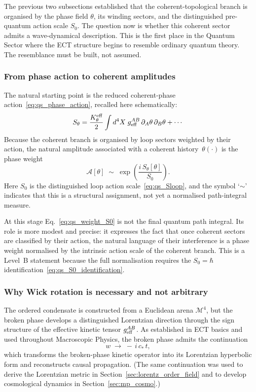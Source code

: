 \medskip
The previous two subsections established that the coherent-topological
branch is organised by the phase field $\theta$, its winding sectors,
and the distinguished pre-quantum action scale $S_0$.
The question now is whether this coherent sector admits a
wave-dynamical description.
This is the first place in the Quantum Sector where the ECT structure
begins to resemble ordinary quantum theory.
The resemblance must be built, not assumed.

\subsubsection*{From phase action to coherent amplitudes}

The natural starting point is the reduced coherent-phase
action~\eqref{eq:qs_phase_action}, recalled here schematically:
\[
  S_\theta
  = \frac{K_\theta^{\rm eff}}{2}
    \int d^4X\; g_{\rm eff}^{AB}\,\partial_A\theta\,\partial_B\theta
    + \cdots
\]
Because the coherent branch is organised by loop sectors weighted by
their action, the natural amplitude associated with a coherent
history~$\theta(\cdot)$ is the phase weight
\begin{equation}
  \label{eq:qs_weight_S0}
  \mathcal{A}[\theta]
  \;\sim\;
  \exp\!\left(\frac{i\,S_\theta[\theta]}{S_0}\right).
\end{equation}
Here $S_0$ is the distinguished loop action scale~\eqref{eq:qs_Sloop},
and the symbol `$\sim$' indicates that this is a structural assignment,
not yet a normalised path-integral measure.

At this stage Eq.~\eqref{eq:qs_weight_S0} is not the final quantum
path integral.
Its role is more modest and precise: it expresses the fact that once
coherent sectors are classified by their action, the natural language
of their interference is a phase weight normalised by the intrinsic
action scale of the coherent branch.
This is a Level~B statement because the full normalisation requires the
$S_0=\hbar$ identification~\eqref{eq:qs_S0_identification}.

\subsubsection*{Why Wick rotation is necessary and not arbitrary}

The ordered condensate is constructed from a Euclidean arena
$\mathcal{M}^4$, but the broken phase develops a distinguished
Lorentzian direction through the sign structure of the effective kinetic
tensor $g_{\rm eff}^{AB}$.
As established in ECT basics and used throughout Macroscopic Physics,
the broken phase admits the continuation
\begin{equation}
  \label{eq:qs_wick}
  w \;\to\; -\,i\,c_*\,t,
\end{equation}
which transforms the broken-phase kinetic operator into its Lorentzian
hyperbolic form and reconstructs causal propagation.
(The same continuation was used to derive the Lorentzian metric
in Section~\ref{sec:lorentz_order_field} and to develop
cosmological dynamics in Section~\ref{sec:mp_cosmo}.)

